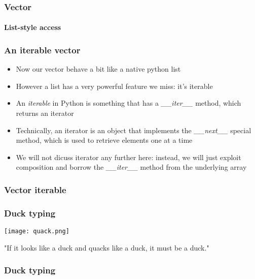 \documentclass[9pt]{beamer}
\begin{document}
\begin{frame}
  \frametitle{Vector}
  \framesubtitle{List-style access}
  
\end{frame}


\begin{frame}
  \frametitle{An iterable vector}
  
  \begin{itemize}
    \item Now our vector behave a bit like a native python list
    \medskip
    \item However a list has a very powerful feature we miss: it's \alert{iterable}
    \medskip
    \item An \emph{iterable} in Python is something that has a
          \emph{\_\_iter\_\_} method, which returns an \alert{iterator}
    \medskip
    \item Technically, an iterator is an object that implements the
          \emph{\_\_next\_\_} special method, which is used to retrieve elements
          one at a time
    \medskip
    \item We will not dicuss iterator any further here: instead, we will just
          exploit composition and borrow the \emph{\_\_iter\_\_} method from the 
          underlying array
  \end{itemize}
  
\end{frame}

\begin{frame}
  \frametitle{Vector iterable}
  
\end{frame}


\begin{frame}
  \frametitle{Duck typing}
  
  \centering
  \texttt{[image: quack.png]}  
  
  \bigskip
  
  \centering
  "If it looks like a duck and quacks like a duck, it must be a duck."
  
\end{frame}


\begin{frame}
  \frametitle{Duck typing}
  
\end{frame}
\end{document}
